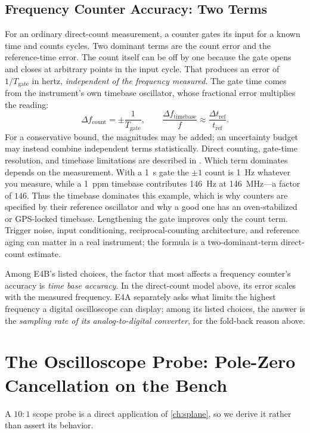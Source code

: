 \subsection{Frequency Counter Accuracy: Two Terms}
For an ordinary direct-count measurement, a counter gates its input for a known time
and counts cycles. Two dominant terms are the count error and the reference-time error.
The count itself can be off by one because the gate opens and closes at arbitrary
points in the input cycle. That produces an error of \(1/T_{\text{gate}}\) in hertz,
\emph{independent of the frequency measured}. The gate time comes from the instrument's
own timebase oscillator, whose fractional error multiplies the reading:
\[
\Delta f_{\mathrm{count}}=\pm\frac{1}{T_{\text{gate}}},
\qquad
\frac{\Delta f_{\mathrm{timebase}}}{f}\approx
\frac{\Delta t_{\mathrm{ref}}}{t_{\mathrm{ref}}}.
\]
For a conservative bound, the magnitudes may be added; an uncertainty budget may
instead combine independent terms statistically. Direct counting, gate-time
resolution, and timebase limitations are described in
\cite[pp.~158--165]{carr2002measurement}. Which term dominates depends on the
measurement. With a \SI{1}{\second} gate
the \(\pm1\) count is \SI{1}{\hertz} whatever you measure, while a \SI{1}{ppm}
timebase contributes \SI{146}{\hertz} at \SI{146}{\mega\hertz}---a factor of
\(146\). Thus the timebase dominates this example, which is why counters are specified
by their reference oscillator and why a good one has an oven-stabilized or GPS-locked
timebase. Lengthening the gate improves only the count term. Trigger noise, input
conditioning, reciprocal-counting architecture, and reference aging can matter in a
real instrument; the formula is a two-dominant-term direct-count estimate.

\begin{exambox}
Among E4B's listed choices, the factor that most affects a frequency counter's
accuracy is \emph{time base accuracy}. In the direct-count model above, its error
scales with the measured frequency. E4A separately asks what limits the highest
frequency a digital oscilloscope can display; among its listed choices, the answer is
the \emph{sampling rate of its analog-to-digital converter}, for the fold-back reason
above.
\end{exambox}

\section{The Oscilloscope Probe: Pole-Zero Cancellation on the Bench}
\label{sec:probe}
A \(10\!:\!1\) scope probe is a direct application of \cref{ch:splane}, so we derive
it rather than assert its behavior.

